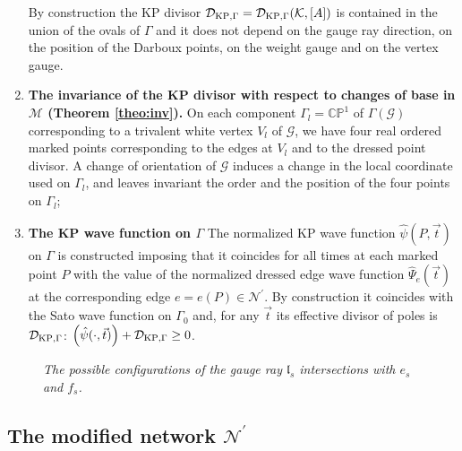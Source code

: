 \documentclass[11pt]{amsart}
\theoremstyle{plain}
\numberwithin{equation}{section}
\def \DKP {{\mathcal D}_{\textup{\scriptsize KP},\Gamma}}
\begin{document}
\begin{enumerate}
By construction the KP divisor $\DKP = \DKP(\mathcal K, [A])$ is contained in  the union of the ovals of $\Gamma$ and it
does not depend on the gauge ray direction, on the position of the Darboux points, on the weight gauge and on the vertex gauge.
\item\textbf{The invariance of the KP divisor with respect to changes of base in ${\mathcal M}$ (Theorem \ref{theo:inv}).} On each component $\Gamma_l=\mathbb{CP}^1$ of $\Gamma(\mathcal G)$ corresponding to a trivalent white vertex $V_l$ of $\mathcal G$, we have four real ordered marked points corresponding to the edges at $V_l$ and to the dressed point divisor. A change of orientation of $\mathcal G$ induces a change in the local coordinate used on $\Gamma_l$, and leaves invariant the order and the position of the four points on $\Gamma_l$;
\item\textbf{The KP wave function on $\Gamma$} The normalized KP wave function $\hat \psi (P, \vec t)$ on $\Gamma$ is constructed imposing that it coincides for all times at each marked point $P$ with the value of the normalized dressed edge wave function $\hat \Psi_e (\vec t)$ at the corresponding edge $e=e(P)\in {\mathcal N}^{\prime}$. By construction it coincides with the Sato wave function on $\Gamma_0$ and, for any $\vec t$ its effective divisor of poles is $\DKP$: $\left(\hat \psi( \cdot, \vec t) \right) + \DKP\ge 0$.
\end{enumerate}

\begin{figure}%
	\vspace{-.5 truecm}
  \caption{\small{\sl The possible configurations of the gauge ray ${\mathfrak l}_s$ intersections with $e_s$ and $f_s$.}\label{fig:Darboux1}}
\end{figure}

\subsection{The modified network ${\mathcal N}^{\prime}$}\label{sec:modN}
\end{document}
